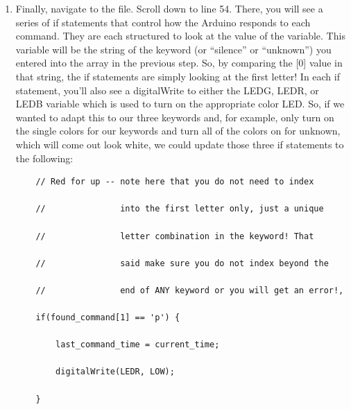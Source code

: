 \begin{enumerate}
  \begin{lstlisting}
    const char* kCategoryLabels[kCategoryCount] = {
        
        "silence",
        
        "unknown",
        
        "up",
        
        "down",
        
        "go",
        
    };
  \end{lstlisting}  
    
  \item  Finally, navigate to the  file. Scroll down to line 54. There, you will see a series of if statements that control how the Arduino responds to each command. They are each structured to look at the value of the  variable. This variable will be the string of the keyword (or ``silence'' or ``unknown'') you entered into the  array in the previous step. So, by comparing the [0] value in that string, the if statements are simply looking at the first letter! In each if statement, you’ll also see a digitalWrite to either the LEDG, LEDR, or LEDB variable which is used to turn on the appropriate color LED. So, if we wanted to adapt this to our three keywords and, for example, only turn on the single colors for our keywords and turn all of the colors on for unknown, which will come out look white, we could update those three if statements to the following:
  
  \begin{lstlisting}
    // Red for up -- note here that you do not need to index
    
    //               into the first letter only, just a unique
    
    //               letter combination in the keyword! That
    
    //               said make sure you do not index beyond the
    
    //               end of ANY keyword or you will get an error!,
    
    if(found_command[1] == 'p') {
        
        last_command_time = current_time;
        
        digitalWrite(LEDR, LOW);
        
    }
  \end{lstlisting}  
    

\end{enumerate}
